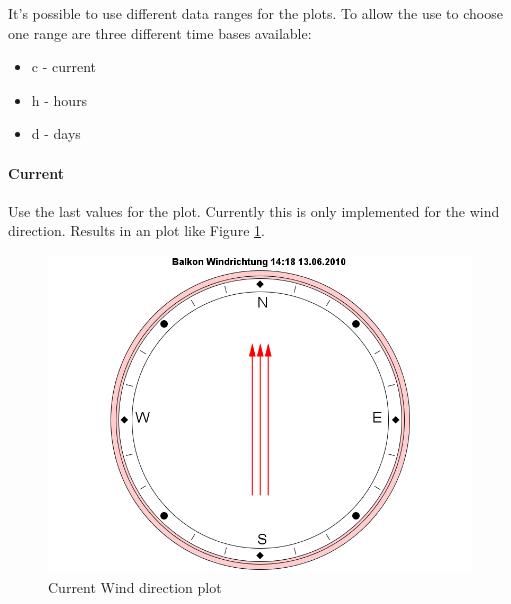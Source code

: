 It's possible to use different data ranges for the plots. To allow the use to choose one range are three different time bases available:
\begin{itemize}
	\item c - current
	\item h - hours
	\item d - days
\end{itemize}

\paragraph{Current} %
\label{par:current}
Use the last values for the plot. Currently this is only implemented for the wind direction. Results in an plot like Figure \ref{fig:current}.
\begin{figure}[ht]
    \centering
    \includegraphics[width=0.9\linewidth]{master/plot_examplec.png}
    \caption{Current Wind direction plot}
    \label{fig:current}
\end{figure}

